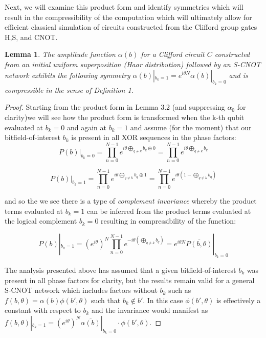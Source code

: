 \documentclass[reqno]{amsart}
\newtheorem{lem}[thm]{Lemma}
\theoremstyle{definition}
\theoremstyle{remark}
\begin{document}
Next, we will examine this product form and identify symmetries which will result in the compressibility of the computation which will ultimately allow for efficient classical simulation of circuits constructed from the Clifford group gates H,S, and CNOT.


\begin{lem}
The amplitude function $\alpha(b)$ for a Clifford circuit $C$ constructed from an initial uniform superposition (Haar distribution) followed by an S-CNOT network exhibits the following symmetry $\alpha(b) |_{b_k=1} = e^{i \theta N} \overline{\alpha(b)} |_{b_k = 0}$ and is compressible in the sense of Definition 1.
 \end{lem}


\begin{proof}

\noindent
Starting from the product form in Lemma 3.2 (and suppressing $\alpha_0$ for clarity)we will see how the product form is transformed when the k-th qubit evaluated at $b_k=0$ and again at $b_k=1$ and assume (for the moment) that our bitfield-of-interest $b_k$ is present in all  XOR sequences in the phase factors:
\begin{equation}
P(b) |_{b_k=0} =   \prod_{n=0}^{N-1}{   e^{i\theta \bigoplus_{q \ne k } b_q   \oplus 0}   }  =   \prod_{n=0}^{N-1}{   e^{i\theta \bigoplus_{q \ne k } b_q  } } 
\end{equation}

\begin{equation}
P(b) |_{b_k=1} =  \prod_{n=0}^{N-1}{   e^{i\theta \bigoplus_{q \ne k } b_q   \oplus 1}   }  = \prod_{n=0}^{N-1}{   e^{i\theta (1-\bigoplus_{q \ne k } b_q ) }  } 
\end{equation}

\noindent
and so the we see there is a type of {\it{complement invariance}} whereby the product terms evaluated at $b_k=1$ can be inferred from the product terms evaluated at the logical complement $b_k=0$ resulting in compressibility of the function:

\begin{equation}
P(b) |_{b_k=1} =    (e^{i \theta})^N    \prod_{n=0}^{N-1}{   e^{-i\theta (\bigoplus_{q \ne k } b_q ) }} =   e^{i \theta N} \overline{ P(b,\theta) } |_{b_k=0}
\end{equation}


\noindent
The analysis presented above has assumed that a given bitfield-of-interest $b_k$ was present in all phase factors for clarity, but the results remain valid for a general S-CNOT network which includes factors without $b_k$ such as $f(b,\theta) = \alpha(b) \phi(b',\theta)$  such that $b_k \notin b'$. In this case $\phi(b',\theta)$ is effectively a constant with respect to $b_k$ and the invariance would manifest as $f(b,\theta) |_{b_k=1} = (e^{i \theta})^N \overline{ \alpha(b) } |_{b_k=0} \cdot \phi(b',\theta)$. 
\newline


\end{proof}
\end{document}
